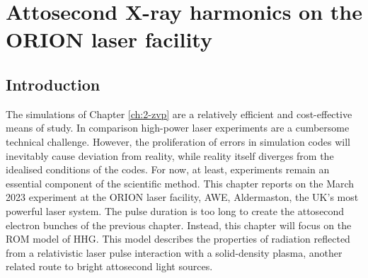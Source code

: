 \chapter{\label{ch:3-orion}Attosecond X-ray harmonics on the ORION laser facility} 

\minitoc

\section{Introduction}
The simulations of Chapter \ref{ch:2-zvp} are a relatively efficient and cost-effective means of study. In comparison high-power laser experiments are a cumbersome technical challenge. However, the proliferation of errors in simulation codes will inevitably cause deviation from reality, while reality itself diverges from the idealised conditions of the codes. For now, at least, experiments remain an essential component of the scientific method. This chapter reports on the March 2023 experiment at the ORION laser facility, AWE, Aldermaston, the UK's most powerful laser system. The pulse duration is too long to create the attosecond electron bunches of the previous chapter. Instead, this chapter will focus on the ROM model of HHG. This model describes the properties of radiation reflected from a relativistic laser pulse interaction with a solid-density plasma, another related route to bright attosecond light sources. 

